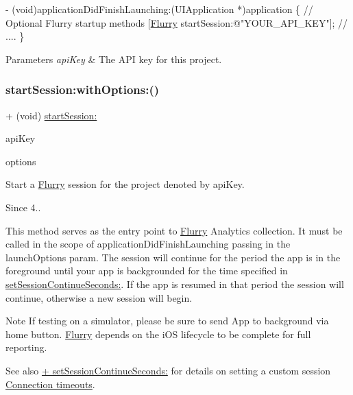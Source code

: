 \begin{DoxyCode}
   - (void)applicationDidFinishLaunching:(UIApplication *)application 
\{
\textcolor{comment}{// Optional Flurry startup methods}
[\hyperlink{interfaceFlurry}{Flurry} startSession:\textcolor{stringliteral}{@"YOUR\_API\_KEY"}];
\textcolor{comment}{// ....}
\}
\end{DoxyCode}



\begin{DoxyParams}{Parameters}
{\em api\+Key} & The A\+PI key for this project. \\
\hline
\end{DoxyParams}
\mbox{\label{interfaceFlurry_a31b4253cab9e640a2c8815930211ff9f}} 
\subsubsection{\texorpdfstring{start\+Session\+:with\+Options\+:()}{startSession:withOptions:()}}
{\footnotesize\ttfamily + (void) \hyperlink{interfaceFlurry_aeadfa23545c392ffd46db448b6a95809}{start\+Session\+:} \begin{DoxyParamCaption}\item[{(N\+S\+String $\ast$)}]{api\+Key }\item[{withOptions:(id)}]{options }\end{DoxyParamCaption}}



Start a \hyperlink{interfaceFlurry}{Flurry} session for the project denoted by {\ttfamily api\+Key}. 

\begin{DoxySince}{Since}
4..
\end{DoxySince}
This method serves as the entry point to \hyperlink{interfaceFlurry}{Flurry} Analytics collection. It must be called in the scope of {\ttfamily application\+Did\+Finish\+Launching} passing in the launch\+Options param. The session will continue for the period the app is in the foreground until your app is backgrounded for the time specified in \hyperlink{interfaceFlurry_a1b79d4d804074f4b66f3434d9318ceee}{set\+Session\+Continue\+Seconds\+:}. If the app is resumed in that period the session will continue, otherwise a new session will begin.

\begin{DoxyNote}{Note}
If testing on a simulator, please be sure to send App to background via home button. \hyperlink{interfaceFlurry}{Flurry} depends on the i\+OS lifecycle to be complete for full reporting.
\end{DoxyNote}
\begin{DoxySeeAlso}{See also}
\hyperlink{interfaceFlurry_a1b79d4d804074f4b66f3434d9318ceee}{+ set\+Session\+Continue\+Seconds\+:} for details on setting a custom session \hyperlink{group__timeout}{Connection timeouts}.
\end{DoxySeeAlso}

